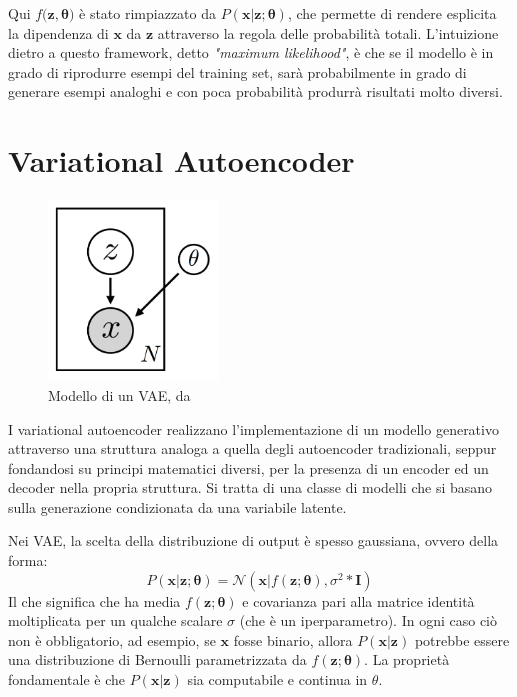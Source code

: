 Qui $f(\boldsymbol{z}, \boldsymbol{\theta)}$ è stato rimpiazzato da $P(\boldsymbol{x} | \boldsymbol{z}; \boldsymbol{\theta})$, che permette di rendere esplicita la dipendenza di $\boldsymbol{x}$ da $\boldsymbol{z}$ attraverso la regola delle probabilità totali. L'intuizione dietro a questo framework, detto \textit{"maximum likelihood"}, è che se il modello è in grado di riprodurre esempi del training set, sarà probabilmente in grado di generare esempi analoghi e con poca probabilità produrrà risultati molto diversi.
\section{Variational Autoencoder}
\label{sec:vae}
\begin{figure}[ht]
	\centering
	\includegraphics[width=0.4\textwidth]{img/vae_model.png}
	\caption{Modello di un VAE, da \cite{VAE_tut}}
	\label{fig:1.13}
\end{figure}
I variational autoencoder \cite{VAE} realizzano l'implementazione di un modello generativo attraverso una struttura analoga a quella degli autoencoder tradizionali, seppur fondandosi su principi matematici diversi, per la presenza di un encoder ed un decoder nella propria struttura. Si tratta di una classe di modelli che si basano sulla generazione condizionata da una variabile latente.

Nei VAE, la scelta della distribuzione di output è spesso gaussiana, ovvero della forma:
\begin{equation}
	\label{gaussian_probability}
	P(\boldsymbol{x} | \boldsymbol{z}; \boldsymbol{\theta}) = \mathcal{N}(\boldsymbol{x}|f(\boldsymbol{z}; \boldsymbol{\theta}), \sigma^2 * \boldsymbol{I})
\end{equation}
Il che significa che ha media $f(\boldsymbol{z}; \boldsymbol{\theta})$ e covarianza pari alla matrice identità moltiplicata per un qualche scalare $\sigma$ (che è un iperparametro). In ogni caso ciò non è obbligatorio, ad esempio, se $\boldsymbol{x}$ fosse binario, allora $P(\boldsymbol{x} | \boldsymbol{z})$ potrebbe essere una distribuzione di Bernoulli parametrizzata da $f(\boldsymbol{z}; \boldsymbol{\theta})$. La proprietà fondamentale è che $P(\boldsymbol{x} | \boldsymbol{z})$ sia computabile e continua in $\theta$.

